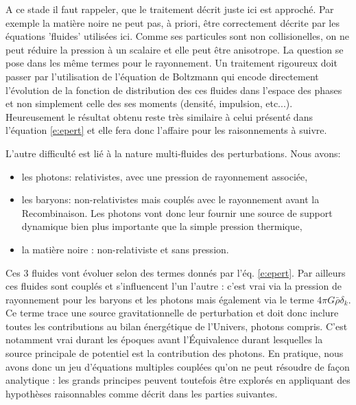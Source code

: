  A ce stade il faut rappeler, que le traitement décrit juste ici est approché. Par exemple la matière noire  ne peut pas, à priori, être correctement décrite par les équations 'fluides' utilisées ici. Comme ses particules sont non collisionelles, on ne peut réduire la pression à un scalaire et elle peut être anisotrope. La question se pose dans les même termes pour le rayonnement. Un traitement rigoureux doit passer par l'utilisation de l'équation de Boltzmann qui encode directement l'évolution de la fonction de distribution des ces fluides dans l'espace des phases et non simplement celle des ses moments (densité, impulsion, etc...).  Heureusement le résultat obtenu reste très similaire à celui présenté dans l'équation \ref{e:epert} et elle fera donc l'affaire pour les raisonnements à suivre.
 
 L'autre difficulté est lié à la nature multi-fluides des perturbations. Nous avons:
 \begin{itemize}
 \item les photons: relativistes, avec une pression de rayonnement associée,
 \item les baryons: non-relativistes mais couplés avec le rayonnement avant la Recombinaison. Les photons vont donc leur fournir une source de support dynamique bien plus importante que la simple pression thermique,
 \item la matière noire : non-relativiste et sans pression.
 \end{itemize}
 Ces 3 fluides vont évoluer selon des termes donnés par l'éq. \ref{e:epert}. Par ailleurs ces fluides sont couplés et s'influencent l'un l'autre : c'est vrai via la pression de rayonnement pour les baryons et les photons mais également via le terme $4\pi G \bar \rho \delta_k$. Ce terme trace une source gravitationnelle de perturbation et doit donc inclure toutes les contributions au bilan énergétique de l'Univers, photons compris. C'est notamment vrai durant les époques avant l'Équivalence  durant lesquelles la source principale de potentiel est la contribution des photons. En pratique, nous avons donc un jeu d'équations multiples couplées qu'on ne peut résoudre de façon analytique : les grands principes peuvent toutefois être explorés en appliquant des hypothèses raisonnables comme décrit dans les parties suivantes.
 

